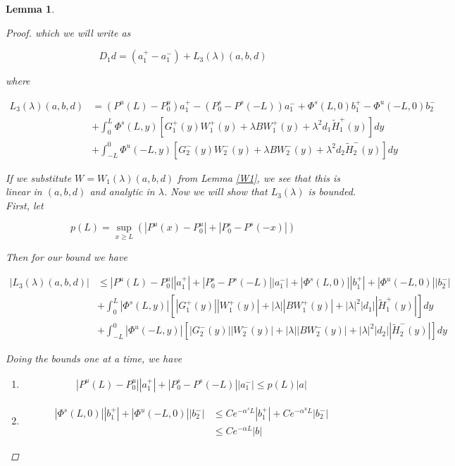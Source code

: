 \documentclass[12pt]{article}
\newtheorem{lemma}{Lemma}
\begin{document}
\begin{lemma}
\begin{proof}
which we will write as

\begin{equation}
D_1 d = (a^+_1 - a^-_1) + L_3(\lambda)(a,b,d)
\end{equation}

where 

\begin{align*}
L_3(\lambda)(a,b,d) &= (P^u(L) - P_0^u) a^+_1 - (P_0^s - P^s(-L)) a^-_1 + \Phi^s(L, 0)b_1^+ - \Phi^u(-L, 0)b_2^- \\
&+ \int_0^L \Phi^s(L, y)[G_1^+(y) W_1^+(y) + \lambda B W_1^+(y) + \lambda^2 d_1 \tilde{H}_1^+(y) ] dy \\
&+ \int_{-L}^0 \Phi^u(-L, y)[G_2^-(y) W_2^-(y) + \lambda B W_2^-(y) + \lambda^2 d_2 \tilde{H}_2^-(y) ] dy 
\end{align*}

If we substitute $W = W_1(\lambda)(a,b,d)$ from Lemma \ref{W1}, we see that this is linear in $(a,b,d)$ and analytic in $\lambda$. Now we will show that $L_3(\lambda)$ is bounded. First, let

\[
p(L) = \sup_{x \geq L} (|P^u(x) - P_0^u| + |P_0^s - P^s(-x)|)
\]

Then for our bound we have

\begin{align*}
|L_3(\lambda)(a,b,d)| &\leq |P^u(L) - P_0^u|| a^+_1| + |P_0^s - P^s(-L)||a^-_1| + |\Phi^s(L, 0)||b_1^+| + |\Phi^u(-L, 0)||b_2^-| \\
&+ \int_0^L |\Phi^s(L, y)|[|G_1^+(y)||W_1^+(y)| + |\lambda| |B W_1^+(y)| + |\lambda|^2 |d_1| |\tilde{H}_1^+(y)| ] dy \\
&+ \int_{-L}^0 |\Phi^u(-L, y)|[|G_2^-(y)||W_2^-(y)| + |\lambda| |B W_2^-(y)| + |\lambda|^2 |d_2| |\tilde{H}_2^-(y)| ] dy 
\end{align*}

Doing the bounds one at a time, we have

\begin{enumerate}

\item
\begin{align*}
|P^u(L) - P_0^u|| a^+_1| + |P_0^s - P^s(-L)||a^-_1| \leq p(L)|a|
\end{align*}

\item
\begin{align*}
|\Phi^s(L, 0)||b_1^+| + |\Phi^u(-L, 0)||b_2^-| &\leq C e^{-\alpha^s L} |b_1^+| + C e^{-\alpha^u L}|b_2^-| \\
&\leq C e^{-\alpha L}|b|
\end{align*}


\end{enumerate}
\end{proof}
\end{lemma}
\end{document}
